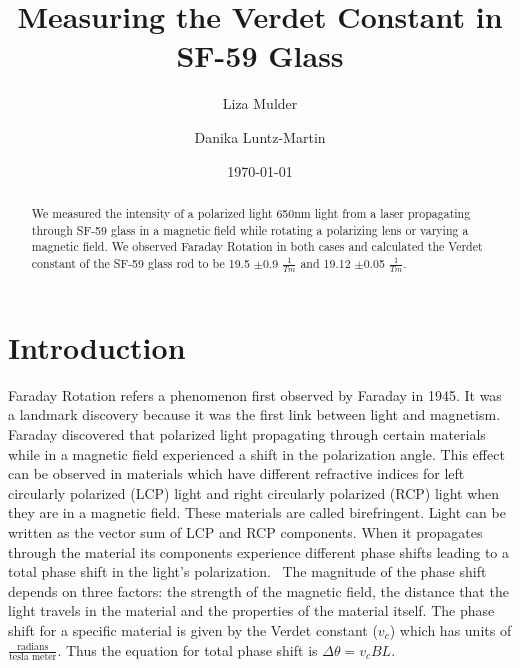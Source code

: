 \documentclass[prb,preprint]{revtex4-1}
\begin{document}

\title{Measuring the Verdet Constant in SF-59 Glass}


\author{Liza Mulder}


\author{Danika Luntz-Martin}


\date{\today}



\begin{abstract}

We measured the intensity of a polarized light 650nm light from a laser propagating through SF-59 glass in a magnetic field while rotating a polarizing lens or varying a magnetic field.  We observed Faraday Rotation in both cases and calculated the Verdet constant of the SF-59 glass rod to be 19.5 $\pm$0.9 $\frac{1}{Tm}$ and 19.12 $\pm$0.05 $\frac{1}{Tm}$.

\end{abstract}

\maketitle %


\section{Introduction} %

Faraday Rotation refers a phenomenon first observed by Faraday in 1945. It was a landmark discovery because it was the first link between light and magnetism.~\cite{teachspin} Faraday discovered that polarized light propagating through certain materials while in a magnetic field experienced a shift in the polarization angle. This effect can be observed in materials which have different refractive indices for left circularly polarized (LCP) light and right circularly polarized (RCP) light when they are in a magnetic field. These materials are called birefringent. Light can be written as the vector sum of LCP and RCP components. When it propagates through the material its components experience different phase shifts leading to a total phase shift in the light's polarization.~\cite{XXX} The magnitude of the phase shift depends on three factors: the strength of the magnetic field, the distance that the light travels in the material and the properties of the material itself. The phase shift for a specific material is given by the Verdet constant ($v_c$) which has units of $\frac{\text{radians}}{\text{tesla\ meter}}$. Thus the equation for total phase shift is $\Delta \theta = v_c B L$.
\end{document}
